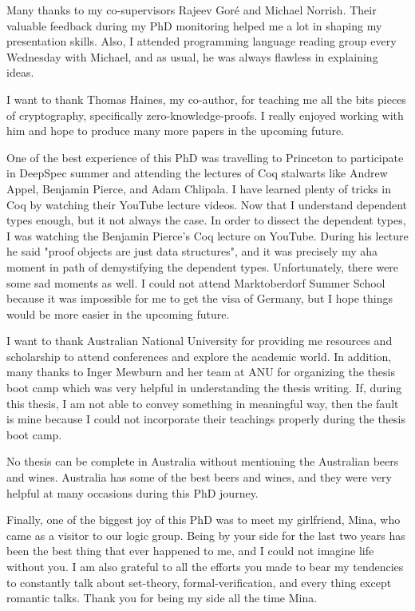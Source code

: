 Many thanks to my co-supervisors Rajeev Gor\'e and Michael Norrish. Their valuable feedback during my PhD monitoring 
helped me a lot in shaping my presentation skills. Also, I attended programming language reading 
group every Wednesday with  Michael, and as usual, he was always flawless in explaining ideas. 
 
 I want to thank Thomas Haines, my co-author,  for teaching me all the bits pieces of cryptography, specifically zero-knowledge-proofs.  
 I really enjoyed working with him and hope to produce many more papers in the upcoming future. 
 
 
 One of the best experience of this PhD was travelling to Princeton to participate in DeepSpec summer and attending 
 the lectures of Coq stalwarts  like Andrew Appel, Benjamin Pierce, and Adam Chlipala. I have learned 
 plenty of tricks in Coq by watching their YouTube lecture videos. Now that I understand 
 dependent types enough, but it not always the case. In order to dissect the dependent types, 
 I was watching the Benjamin Pierce's Coq lecture on YouTube. During his lecture he said  "proof objects are 
 just data structures", and it was precisely my aha moment in path of demystifying the dependent types. 
 Unfortunately, there were some sad moments as well. I could not attend Marktoberdorf Summer School because 
 it was impossible for me to get the visa of Germany, but I hope
 things would be more easier in the upcoming future. 
 
 I want to thank Australian National University for providing me resources and scholarship to attend 
 conferences and explore the academic world. In addition, many thanks to 
 Inger Mewburn  and her team at ANU for organizing the thesis boot camp which was very helpful 
 in understanding the thesis writing. If, during this thesis, I am not able to convey something in 
 meaningful way, then the fault is mine because I could not incorporate their teachings properly 
 during the thesis boot camp. 
  
 No thesis can be complete in Australia without mentioning the Australian beers and wines. 
 Australia has some of the best beers and wines, and they were very helpful at many occasions
 during this PhD journey. 
 
 Finally, one of the biggest joy of this PhD was to meet my girlfriend, Mina, who came as a visitor 
 to our logic group. Being by your side for the last two years has been the best thing that ever happened to me, and I could not 
 imagine life without you.   I am also grateful to all the efforts you made to bear my tendencies to constantly
  talk about set-theory, formal-verification, and every thing except romantic talks. Thank you for being my side 
  all the time Mina. 